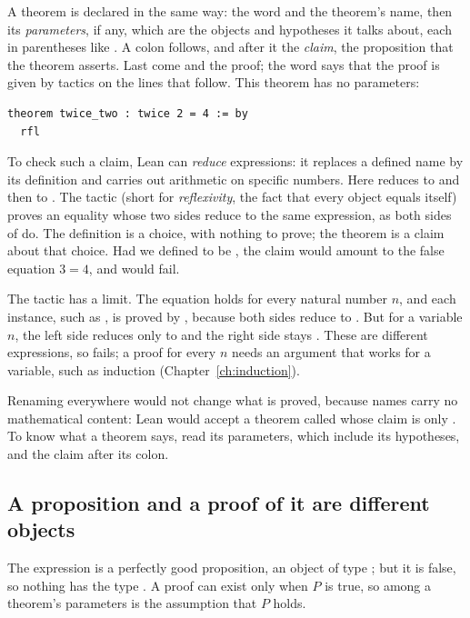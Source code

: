 A theorem is declared in the same way: the word  and the theorem's name, then its \emph{parameters}, if any, which are the objects and hypotheses it talks about, each in parentheses like . A colon follows, and after it the \emph{claim}, the proposition that the theorem asserts. Last come \code{:=} and the proof; the word  says that the proof is given by tactics on the lines that follow. This theorem has no parameters:
\par\noindent\begin{minipage}{\linewidth}
\begin{lstlisting}
theorem twice_two : twice 2 = 4 := by
  rfl
\end{lstlisting}
\end{minipage}\par

To check such a claim, Lean can \emph{reduce} expressions: it replaces a defined name by its definition and carries out arithmetic on specific numbers. Here  reduces to  and then to . The tactic  (short for \emph{reflexivity}, the fact that every object equals itself) proves an equality whose two sides reduce to the same expression, as both sides of  do. The definition is a choice, with nothing to prove; the theorem is a claim about that choice. Had we defined  to be , the claim would amount to the false equation $3=4$, and  would fail.

The tactic  has a limit. The equation  holds for every natural number $n$, and each instance, such as , is proved by , because both sides reduce to . But for a variable $n$, the left side reduces only to  and the right side stays . These are different expressions, so  fails; a proof for every $n$ needs an argument that works for a variable, such as induction (Chapter~\ref{ch:induction}).

Renaming  everywhere would not change what is proved, because names carry no mathematical content: Lean would accept a theorem called  whose claim is only . To know what a theorem says, read its parameters, which include its hypotheses, and the claim after its colon.

\subsection*{A proposition and a proof of it are different objects}
The expression  is a perfectly good proposition, an object of type ; but it is false, so nothing has the type . A proof  can exist only when $P$ is true, so  among a theorem's parameters is the assumption that $P$ holds.

